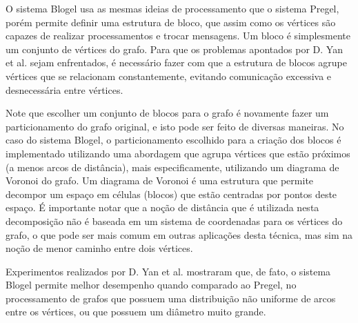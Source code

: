\documentclass[conference]{IEEEtran}
\begin{document}
O sistema Blogel usa as mesmas ideias de processamento que o sistema
Pregel, porém permite definir uma estrutura de bloco, que assim como os
vértices são capazes de realizar processamentos e trocar mensagens. Um
bloco é simplesmente um conjunto de vértices do grafo. Para que os
problemas apontados por D. Yan et al. sejam enfrentados, é necessário
fazer com que a estrutura de blocos agrupe vértices que se relacionam
constantemente, evitando comunicação excessiva e desnecessária entre
vértices.

Note que escolher um conjunto de blocos para o grafo é novamente fazer
um particionamento do grafo original, e isto pode ser feito de diversas
maneiras. No caso do sistema Blogel, o particionamento escolhido para a
criação dos blocos é implementado utilizando uma abordagem que agrupa
vértices que estão próximos (a menos arcos de distância), mais
especificamente, utilizando um diagrama de Voronoi do grafo. Um diagrama
de Voronoi é uma estrutura que permite decompor um espaço em células
(blocos) que estão centradas por pontos deste espaço. É importante notar
que a noção de distância que é utilizada nesta decomposição não é
baseada em um sistema de coordenadas para os vértices do grafo, o que
pode ser mais comum em outras aplicações desta técnica, mas sim na noção
de menor caminho entre dois vértices.

Experimentos realizados por D. Yan et al. mostraram que, de fato, o
sistema Blogel permite melhor desempenho quando comparado ao Pregel, no
processamento de grafos que possuem uma distribuição não uniforme de
arcos entre os vértices, ou que possuem um diâmetro muito grande.
\end{document}
